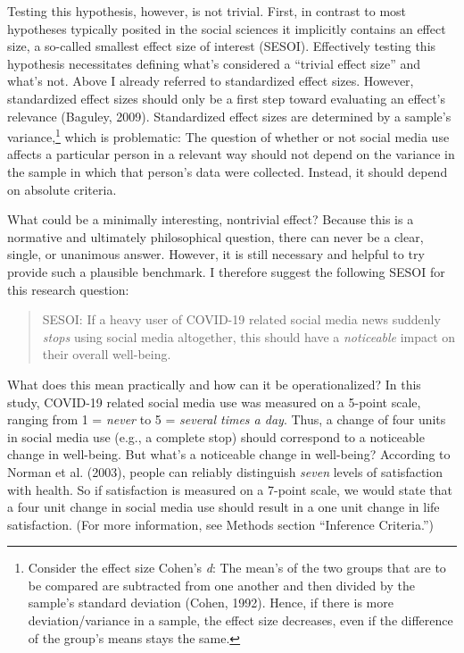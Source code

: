 \documentclass[
  man,mask]{apa7}
\begin{document}
Testing this hypothesis, however, is not trivial.
First, in contrast to most hypotheses typically posited in the social sciences it implicitly contains an effect size, a so-called smallest effect size of interest (SESOI).
Effectively testing this hypothesis necessitates defining what's considered a ``trivial effect size'' and what's not.
Above I already referred to standardized effect sizes.
However, standardized effect sizes should only be a first step toward evaluating an effect's relevance (Baguley, 2009).
Standardized effect sizes are determined by a sample's variance,\footnote{Consider the effect size Cohen's \emph{d}: The mean's of the two groups that are to be compared are subtracted from one another and then divided by the sample's standard deviation (Cohen, 1992). Hence, if there is more deviation/variance in a sample, the effect size decreases, even if the difference of the group's means stays the same.} which is problematic:
The question of whether or not social media use affects a particular person in a relevant way should not depend on the variance in the sample in which that person's data were collected.
Instead, it should depend on absolute criteria.

What could be a minimally interesting, nontrivial effect?
Because this is a normative and ultimately philosophical question, there can never be a clear, single, or unanimous answer.
However, it is still necessary and helpful to try provide such a plausible benchmark.
I therefore suggest the following SESOI for this research question:

\begin{quote}
SESOI: If a heavy user of COVID-19 related social media news suddenly \emph{stops} using social media altogether, this should have a \emph{noticeable} impact on their overall well-being.
\end{quote}

What does this mean practically and how can it be operationalized?
In this study, COVID-19 related social media use was measured on a 5-point scale, ranging from 1 = \emph{never} to 5 = \emph{several times a day}.
Thus, a change of four units in social media use (e.g., a complete stop) should correspond to a noticeable change in well-being.
But what's a noticeable change in well-being?
According to Norman et al. (2003), people can reliably distinguish \emph{seven} levels of satisfaction with health.
So if satisfaction is measured on a 7-point scale, we would state that a four unit change in social media use should result in a one unit change in life satisfaction.
(For more information, see Methods section ``Inference Criteria.'')
\end{document}
